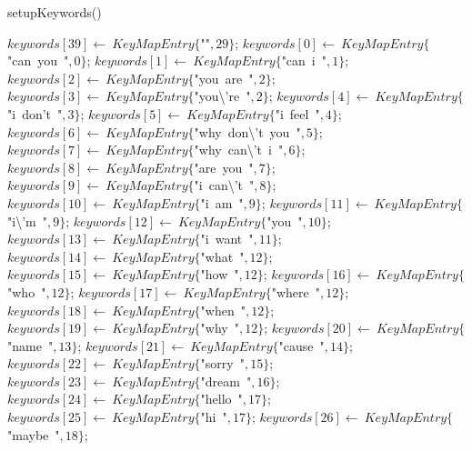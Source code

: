 \documentclass[a4paper,10pt]{article}
\begin{document}
\begin{algorithm}
\caption{setupKeywords()}
\begin{algorithmic}[5]

\STATE {}
\STATE {}
\STATE {}
  \STATE \(keywords[39]\gets\ KeyMapEntry\{\)"{}"{}\(,29\}\);
  \STATE \(keywords[0]\gets\ KeyMapEntry\{\)"{}can\ you\ "{}\(,0\}\);
  \STATE \(keywords[1]\gets\ KeyMapEntry\{\)"{}can\ i\ "{}\(,1\}\);
  \STATE \(keywords[2]\gets\ KeyMapEntry\{\)"{}you\ are\ "{}\(,2\}\);
  \STATE \(keywords[3]\gets\ KeyMapEntry\{\)"{}you\textbackslash{}'{}re\ "{}\(,2\}\);
  \STATE \(keywords[4]\gets\ KeyMapEntry\{\)"{}i\ don'{}t\ "{}\(,3\}\);
  \STATE \(keywords[5]\gets\ KeyMapEntry\{\)"{}i\ feel\ "{}\(,4\}\);
  \STATE \(keywords[6]\gets\ KeyMapEntry\{\)"{}why\ don\textbackslash{}'{}t\ you\ "{}\(,5\}\);
  \STATE \(keywords[7]\gets\ KeyMapEntry\{\)"{}why\ can\textbackslash{}'{}t\ i\ "{}\(,6\}\);
  \STATE \(keywords[8]\gets\ KeyMapEntry\{\)"{}are\ you\ "{}\(,7\}\);
  \STATE \(keywords[9]\gets\ KeyMapEntry\{\)"{}i\ can\textbackslash{}'{}t\ "{}\(,8\}\);
  \STATE \(keywords[10]\gets\ KeyMapEntry\{\)"{}i\ am\ "{}\(,9\}\);
  \STATE \(keywords[11]\gets\ KeyMapEntry\{\)"{}i\textbackslash{}'{}m\ "{}\(,9\}\);
  \STATE \(keywords[12]\gets\ KeyMapEntry\{\)"{}you\ "{}\(,10\}\);
  \STATE \(keywords[13]\gets\ KeyMapEntry\{\)"{}i\ want\ "{}\(,11\}\);
  \STATE \(keywords[14]\gets\ KeyMapEntry\{\)"{}what\ "{}\(,12\}\);
  \STATE \(keywords[15]\gets\ KeyMapEntry\{\)"{}how\ "{}\(,12\}\);
  \STATE \(keywords[16]\gets\ KeyMapEntry\{\)"{}who\ "{}\(,12\}\);
  \STATE \(keywords[17]\gets\ KeyMapEntry\{\)"{}where\ "{}\(,12\}\);
  \STATE \(keywords[18]\gets\ KeyMapEntry\{\)"{}when\ "{}\(,12\}\);
  \STATE \(keywords[19]\gets\ KeyMapEntry\{\)"{}why\ "{}\(,12\}\);
  \STATE \(keywords[20]\gets\ KeyMapEntry\{\)"{}name\ "{}\(,13\}\);
  \STATE \(keywords[21]\gets\ KeyMapEntry\{\)"{}cause\ "{}\(,14\}\);
  \STATE \(keywords[22]\gets\ KeyMapEntry\{\)"{}sorry\ "{}\(,15\}\);
  \STATE \(keywords[23]\gets\ KeyMapEntry\{\)"{}dream\ "{}\(,16\}\);
  \STATE \(keywords[24]\gets\ KeyMapEntry\{\)"{}hello\ "{}\(,17\}\);
  \STATE \(keywords[25]\gets\ KeyMapEntry\{\)"{}hi\ "{}\(,17\}\);
  \STATE \(keywords[26]\gets\ KeyMapEntry\{\)"{}maybe\ "{}\(,18\}\);

\end{algorithmic}
\end{algorithm}
\end{document}
